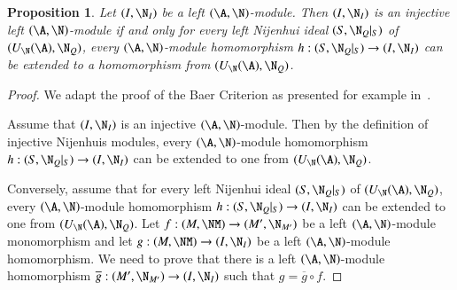 \documentclass[12pt]{amsart}
\newtheorem{prop}[theorem]{Proposition}
\theoremstyle{definition}
\begin{document}
\begin{prop}
Let $(I,\N_I)$ be a left $(\A,\N)$-module. Then $(I,\N_I)$ is an injective left $(\A,\N)$-module if and only for every left Nijenhui ideal $(S,\N_Q|_S)$ of $(U_{\N}(\A),\N_{Q})$, every $(\A,\N)$-module homomorphism $h:(S,\N_Q|_{S})\rightarrow (I,\N_I)$ can be extended to a homomorphism from $(U_{\N}(\A), \N_Q)$.
\end{prop}
\begin{proof}
We adapt the proof of the Baer Criterion as presented for example in~.

Assume that $(I,\N_I)$ is an injective $(\A,\N)$-module. Then by the definition of injective Nijenhuis modules, every $(\A,\N)$-module homomorphism $h:(S,\N_Q|_{S}) \rightarrow (I,\N_I)$ can be extended to one from $(U_{\N}(\A),\N_Q)$.

Conversely, assume that for every left Nijenhui ideal $(S,\N_Q|_S)$ of $(U_{\N}(\A),\N_{Q})$, every $(\A,\N)$-module homomorphism $h:(S,\N_Q|_{S})\rightarrow (I,\N_I)$ can be extended to one from $(U_{\N}(\A), \N_Q)$. Let $f: (M,\NM)\to (M',\N_{M'})$ be a left $(\A,\N)$-module monomorphism and let $g: (M,\NM)\to (I,\N_I)$ be a left $(\A,\N)$-module homomorphism. We need to prove that there is a left $(\A,\N)$-module homomorphism $\overline{g}: (M',\N_{M'}) \to (I, \N_I)$ such that $g=\overline{g} \circ f$.


\end{proof}
\end{document}
